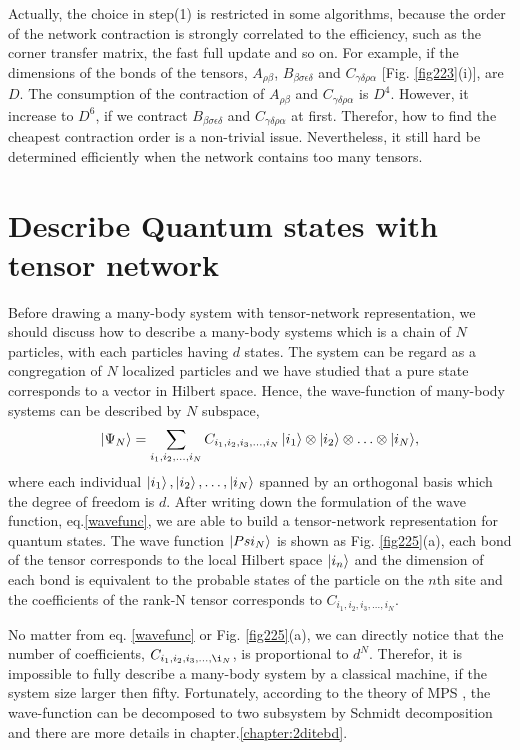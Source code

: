 Actually, the choice in step(1) is restricted in some algorithms, because the order of the network contraction is strongly correlated to the efficiency, such as the corner transfer matrix, the fast full update and so on. For example, if the dimensions of the bonds of the tensors, $A_{\rho \beta}$, $B_{\beta \sigma \epsilon \delta}$ and $C_{\gamma \delta \rho \alpha}$ [Fig. \ref{fig223}(i)], are $D$. The consumption of the contraction of $A_{\rho \beta}$ and $C_{\gamma \delta \rho \alpha}$ is $D^4$. However, it increase to $D^6$, if we contract $B_{\beta \sigma \epsilon \delta}$ and $C_{\gamma \delta \rho \alpha}$ at first. Therefor, how to find the cheapest contraction order is a non-trivial issue. Nevertheless, it still hard be determined efficiently when the network contains too many tensors.

\section{Describe Quantum states with tensor network} %
\label{sub:map2quan}
Before drawing a many-body system with tensor-network representation, we should discuss how to describe a many-body systems which is a chain of $N$ particles, with each particles having $d$ states. The system can be regard as a congregation of $N$ localized particles and we have studied that a pure state corresponds to a vector in Hilbert space. Hence, the wave-function of many-body systems can be described by $N$ subspace,
\begin{align}
	\Ket{\Psi_{N}} =\sum_{i_1,i_2,\ldots,i_N}{C_{i_1,i_2,i_3,\ldots,i_N}\Ket{i_1}\otimes\Ket{i_2}\otimes \ldots \otimes \Ket{i_N}},
	\label{wavefunc}
\end{align}
where each individual $\Ket{i_1}, \Ket{i_2},\ldots, \Ket{i_N}$ spanned by an orthogonal basis which the degree of freedom is $d$. After writing down the formulation of the wave function, eq.\ref{wavefunc}, we are able to build a tensor-network representation for quantum states. The wave function $\Ket{Psi_N}$ is shown as Fig. \ref{fig225}(a), each bond of the tensor corresponds to the local Hilbert space $\Ket{i_n}$ and the dimension of each bond is equivalent to the probable states of the particle on the $n$th site and the coefficients of the rank-N tensor corresponds to $C_{i_1,i_2,i_3,\ldots,i_N}$.

No matter from eq. \ref{wavefunc} or Fig. \ref{fig225}(a), we can directly notice that the number of coefficients, $C_{i_1,i_2,i_3,\ldots,\i_N}$, is proportional to $d^N$. Therefor, it is impossible to fully describe a many-body system by a classical machine, if the system size larger then fifty. Fortunately, according to the theory of MPS \cite{}, the wave-function can be decomposed to two subsystem by Schmidt decomposition and there are more details in chapter.\ref{chapter:2ditebd}. 

